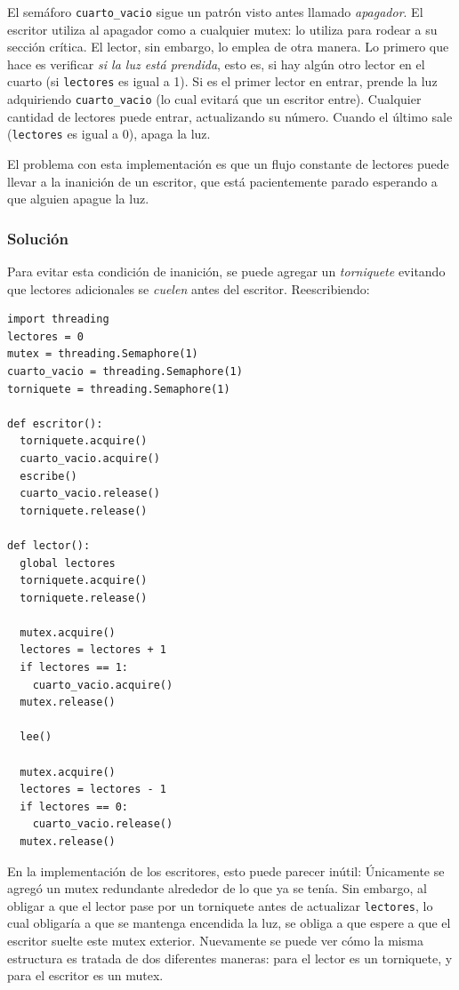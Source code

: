 \documentclass[11pt,fleqn]{book} %
\begin{document}
   El semáforo \texttt{cuarto\_vacio} sigue un patrón visto antes llamado \emph{apagador}. El
   escritor utiliza al apagador como a cualquier mutex: lo utiliza para
   rodear a su sección crítica. El lector, sin embargo, lo emplea de
   otra manera. Lo primero que hace es verificar \emph{si la luz está    prendida}, esto es, si hay algún otro lector en el cuarto (si
   \texttt{lectores} es igual a 1). Si es el primer lector en entrar, prende
   la luz adquiriendo \texttt{cuarto\_vacio} (lo cual evitará que un escritor
   entre). Cualquier cantidad de lectores puede entrar, actualizando su
   número. Cuando el último sale (\texttt{lectores} es igual a 0), apaga la
   luz.

   El problema con esta implementación es que un flujo constante de
   lectores puede llevar a la inanición de un escritor, que está
   pacientemente parado esperando a que alguien apague la luz.
\subsubsection{Solución}
\label{sec-3-3-6-4}


   Para evitar esta condición de inanición, se puede agregar un
   \emph{torniquete} evitando que lectores adicionales se \emph{cuelen} antes del
   escritor. Reescribiendo:


\begin{verbatim}
import threading
lectores = 0
mutex = threading.Semaphore(1)
cuarto_vacio = threading.Semaphore(1)
torniquete = threading.Semaphore(1)

def escritor():
  torniquete.acquire()
  cuarto_vacio.acquire()
  escribe()
  cuarto_vacio.release()
  torniquete.release()

def lector():
  global lectores
  torniquete.acquire()
  torniquete.release()

  mutex.acquire()
  lectores = lectores + 1
  if lectores == 1:
    cuarto_vacio.acquire()
  mutex.release()

  lee()

  mutex.acquire()
  lectores = lectores - 1
  if lectores == 0:
    cuarto_vacio.release()
  mutex.release()
\end{verbatim}

   En la implementación de los escritores, esto puede parecer inútil:
   Únicamente se agregó un mutex redundante alrededor de lo que ya
   se tenía. Sin embargo, al obligar a que el lector pase por un
   torniquete antes de actualizar \texttt{lectores}, lo cual obligaría a que
   se mantenga encendida la luz, se obliga a que espere a que el
   escritor suelte este mutex exterior. Nuevamente se puede ver cómo la misma
   estructura es tratada de dos diferentes maneras: para el lector es
   un torniquete, y para el escritor es un mutex.
\end{document}
